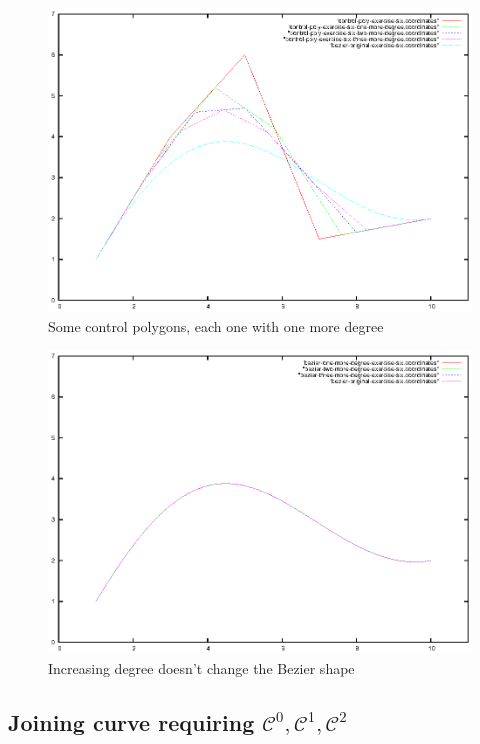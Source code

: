 \documentclass{article}
\begin{document}
\begin{figure}[h!]
  \centering
  \includegraphics{bezier-deCasteljau-curves/exercise-six-higher-degree-control-poly}
  \caption{Some control polygons, each one with one more degree}
  \label{fig:some-increased-degrees}
\end{figure}

\begin{figure}[h!]
  \centering
  \includegraphics{bezier-deCasteljau-curves/exercise-six-one-more-degree-comparison}
  \caption{Increasing degree doesn't change the Bezier shape}
  \label{fig:increasing-degree-does-change-curve}
\end{figure}

\subsection{Joining curve requiring $\mathcal{C}^0, \mathcal{C}^1, \mathcal{C}^2$}
\end{document}
